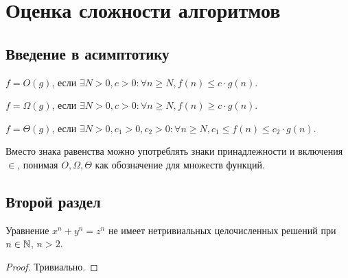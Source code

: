 \section{Оценка сложности алгоритмов}

\subsection{Введение в асимптотику}

\begin{definition}
	$f = O(g)$, если $\exists N > 0, c > 0 : \forall n \ge N, f(n) \le c \cdot g(n)$.
\end{definition}
\begin{definition}
	$f = \Omega(g)$, если $\exists N > 0, c > 0 : \forall n \ge N, f(n) \ge c \cdot g(n)$.
\end{definition}
\begin{definition}
	$f = \Theta(g)$, если $\exists N > 0, c_1 > 0, c_2 > 0: \forall n \ge N, c_1 \le f(n) \le c_2 \cdot g(n)$.
\end{definition}

Вместо знака равенства можно употреблять знаки принадлежности и включения $\in$, понимая $O, \Omega, \Theta$ как обозначение для множеств функций.
\subsection{Второй раздел}


\begin{theorem}
    Уравнение $x^n + y^n = z^n$ не имеет нетривиальных целочисленных решений при $n \in \mathbb{N}$, $n > 2$.
\end{theorem}

\begin{proof}
    Тривиально.
\end{proof}

